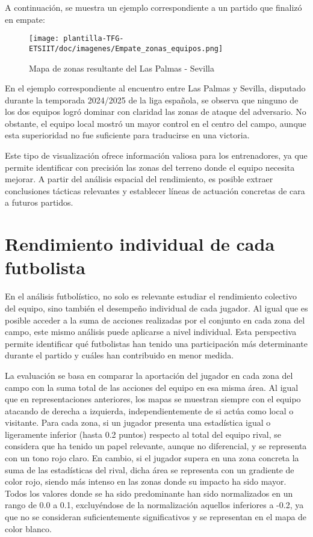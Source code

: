 A continuación, se muestra un ejemplo correspondiente a un partido que finalizó en empate:

\begin{figure}[H]
    \centering
    \texttt{[image: plantilla-TFG-ETSIIT/doc/imagenes/Empate\_zonas\_equipos.png]}
    \caption{Mapa de zonas resultante del Las Palmas - Sevilla}
    \label{fig:etiqueta-imagen}
\end{figure}

En el ejemplo correspondiente al encuentro entre Las Palmas y Sevilla, disputado durante la temporada 2024/2025 de la liga española, se observa que ninguno de los dos equipos logró dominar con claridad las zonas de ataque del adversario. No obstante, el equipo local mostró un mayor control en el centro del campo, aunque esta superioridad no fue suficiente para traducirse en una victoria.

Este tipo de visualización ofrece información valiosa para los entrenadores, ya que permite identificar con precisión las zonas del terreno donde el equipo necesita mejorar. A partir del análisis espacial del rendimiento, es posible extraer conclusiones tácticas relevantes y establecer líneas de actuación concretas de cara a futuros partidos.

\section{Rendimiento individual de cada futbolista}
En el análisis futbolístico, no solo es relevante estudiar el rendimiento colectivo del equipo, sino también el desempeño individual de cada jugador. Al igual que es posible acceder a la suma de acciones realizadas por el conjunto en cada zona del campo, este mismo análisis puede aplicarse a nivel individual. Esta perspectiva permite identificar qué futbolistas han tenido una participación más determinante durante el partido y cuáles han contribuido en menor medida.

La evaluación se basa en comparar la aportación del jugador en cada zona del campo con la suma total de las acciones del equipo en esa misma área. Al igual que en representaciones anteriores, los mapas se muestran siempre con el equipo atacando de derecha a izquierda, independientemente de si actúa como local o visitante. Para cada zona, si un jugador presenta una estadística igual o ligeramente inferior (hasta 0.2 puntos) respecto al total del equipo rival, se considera que ha tenido un papel relevante, aunque no diferencial, y se representa con un tono rojo claro. En cambio, si el jugador supera en una zona concreta la suma de las estadísticas del rival, dicha área se representa con un gradiente de color rojo, siendo más intenso en las zonas donde su impacto ha sido mayor. Todos los valores donde se ha sido predominante han sido normalizados en un rango de 0.0 a 0.1, excluyéndose de la normalización aquellos inferiores a -0.2, ya que no se consideran suficientemente significativos y se representan en el mapa de color blanco. 

